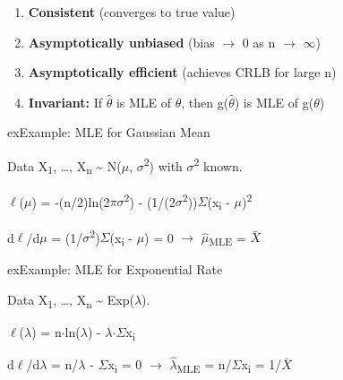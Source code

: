 
\begin{enumerate}
\def\labelenumi{\arabic{enumi}.}
\tightlist
\item
  \textbf{Consistent} (converges to true value)
\item
  \textbf{Asymptotically unbiased} (bias \ensuremath{\to} 0 as n \ensuremath{\to} \ensuremath{\infty})
\item
  \textbf{Asymptotically efficient} (achieves CRLB for large n)
\item
  \textbf{Invariant:} If \ensuremath{\hat{\theta}} is MLE of \ensuremath{\theta}, then g(\ensuremath{\hat{\theta}}) is MLE of g(\ensuremath{\theta})
\end{enumerate}

\begin{PSbox}[unbreakable]{ex}{Example: MLE for Gaussian Mean}

Data X\textsubscript{1}, …, X\textsubscript{n} \textasciitilde{} N(\ensuremath{\mu}, \ensuremath{\sigma}\textsuperscript{2}) with \ensuremath{\sigma}\textsuperscript{2} known.

\ensuremath{\ell}(\ensuremath{\mu}) = -(n/2)ln(2\ensuremath{\pi}\ensuremath{\sigma}\textsuperscript{2}) - (1/(2\ensuremath{\sigma}\textsuperscript{2}))\ensuremath{\Sigma}(x\textsubscript{i} - \ensuremath{\mu})\textsuperscript{2}

d\ensuremath{\ell}/d\ensuremath{\mu} = (1/\ensuremath{\sigma}\textsuperscript{2})\ensuremath{\Sigma}(x\textsubscript{i} - \ensuremath{\mu}) = 0 \ensuremath{\to} \ensuremath{\hat{\mu}}\textsubscript{MLE} = \ensuremath{\bar{X}}

\end{PSbox}

\begin{PSbox}[unbreakable]{ex}{Example: MLE for Exponential Rate}

Data X\textsubscript{1}, …, X\textsubscript{n} \textasciitilde{} Exp(\ensuremath{\lambda}).

\ensuremath{\ell}(\ensuremath{\lambda}) = n\ensuremath{\cdot}ln(\ensuremath{\lambda}) - \ensuremath{\lambda}\ensuremath{\cdot}\ensuremath{\Sigma}x\textsubscript{i}

d\ensuremath{\ell}/d\ensuremath{\lambda} = n/\ensuremath{\lambda} - \ensuremath{\Sigma}x\textsubscript{i} = 0 \ensuremath{\to} \ensuremath{\hat{\lambda}}\textsubscript{MLE} = n/\ensuremath{\Sigma}x\textsubscript{i} = 1/\ensuremath{\bar{X}}

\end{PSbox}

